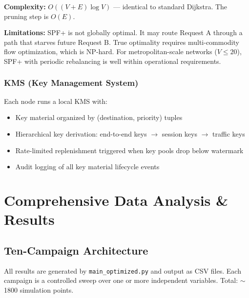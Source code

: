 \documentclass[11pt,a4paper,oneside]{report}
\begin{document}
\textbf{Complexity:} $O((V+E)\log V)$ — identical to standard Dijkstra. The pruning step is $O(E)$.

\textbf{Limitations:} SPF+ is not globally optimal. It may route Request A through a path that starves future Request B. True optimality requires multi-commodity flow optimization, which is NP-hard. For metropolitan-scale networks ($V \leq 20$), SPF+ with periodic rebalancing is well within operational requirements.

\subsection{KMS (Key Management System)}

Each node runs a local KMS with:
\begin{itemize}
\item Key material organized by (destination, priority) tuples
\item Hierarchical key derivation: end-to-end keys $\to$ session keys $\to$ traffic keys
\item Rate-limited replenishment triggered when key pools drop below watermark
\item Audit logging of all key material lifecycle events
\end{itemize}


\chapter{Comprehensive Data Analysis \& Results}

\section{Ten-Campaign Architecture}

All results are generated by \texttt{main\_optimized.py} and output as CSV files. Each campaign is a controlled sweep over one or more independent variables. Total: $\sim$1800 simulation points.
\end{document}
